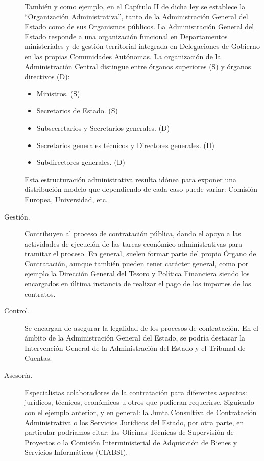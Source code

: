 \begin{description}
También y como ejemplo, en el Capítulo II de dicha ley se establece
la ``Organización Administrativa'', tanto de la Administración General del Estado como de sus Organismos públicos. La Administración 
General del Estado responde a una organización funcional en Departamentos ministeriales y de gestión
territorial integrada en Delegaciones de Gobierno en las propias
Comunidades Autónomas. La organización de la Administración Central distingue
entre órganos superiores (S) y órganos directivos (D):
\begin{itemize}
 \item Ministros. (S)
 \item Secretarios de Estado. (S)
 \item Subsecretarios y Secretarios generales. (D)
 \item Secretarios generales técnicos y Directores generales. (D)
 \item Subdirectores generales. (D)
\end{itemize}

Esta estructuración administrativa resulta idónea para exponer una distribución modelo que dependiendo de cada
caso puede variar: Comisión Europea, Universidad, etc.

\item [Gestión.] Contribuyen al proceso de contratación pública, dando el apoyo a las actividades
de ejecución de las tareas económico-administrativas para tramitar el proceso. En general, suelen formar
parte del propio Órgano de Contratación, aunque también pueden tener carácter general, como por ejemplo la 
Dirección General del Tesoro y Política Financiera siendo los encargados en última instancia de realizar el pago
de los importes de los contratos.

\item [Control.] Se encargan de asegurar la legalidad de los procesos de contratación. En el ámbito
de la Administración General del Estado, se podría destacar la Intervención General de la Administración del Estado y el
Tribunal de Cuentas.

\item [Asesoría.] Especialistas colaboradores de la contratación para diferentes aspectos: jurídicos, técnicos, económicos u 
otros que pudieran requerirse. Siguiendo con el ejemplo anterior, y en general: la Junta Consultiva de Contratación Administrativa o 
los Servicios Jurídicos del Estado, por otra parte, en particular podríamos citar: las Oficinas Técnicas de Supervisión
de Proyectos o la Comisión Interministerial de Adquisición de Bienes y Servicios Informáticos (CIABSI).



\end{description}
